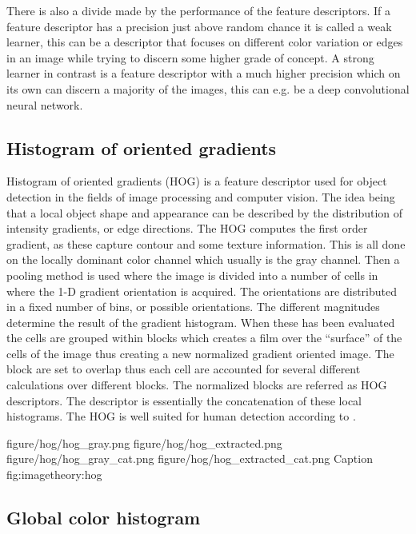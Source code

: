 There is also a divide made by the performance of the feature descriptors. If a feature descriptor has a precision just above random chance it is called a weak learner, this can be a descriptor that focuses on different color variation or edges in an image while trying to discern some higher grade of concept. A strong learner in contrast is a feature descriptor with a much higher precision which on its own can discern a majority of the images, this can e.g. be a deep convolutional neural network. 


\subsection{Histogram of oriented gradients}
\label{sec:hog_feature}
Histogram of oriented gradients (HOG) is a feature descriptor used for object detection in the fields of image processing and computer vision. The idea being that a local object shape and appearance can be described by the distribution of intensity gradients, or edge directions. The HOG computes the first order gradient, as these capture contour and some texture information. This is all done on the locally dominant color channel which usually is the gray channel. Then a pooling method is used where the image is divided into a number of cells in where the 1-D gradient orientation is acquired. The orientations are distributed in a fixed number of bins, or possible orientations. The different magnitudes determine the result of the gradient histogram. When these has been evaluated the cells are grouped within blocks which creates a film over the ``surface'' of the cells of the image thus creating a new normalized gradient oriented image. The block are set to overlap thus each cell are accounted for several different calculations over different blocks. The normalized blocks are referred as HOG descriptors. The descriptor is essentially the concatenation of these local histograms. The HOG is well suited for human detection according to \cite{dalal2005histograms}. 

\fourfigure
{figure/hog/hog_gray.png}
{figure/hog/hog_extracted.png}
{figure/hog/hog_gray_cat.png}
{figure/hog/hog_extracted_cat.png}
{Caption}
{fig:imagetheory:hog} 

\subsection{Global color histogram}
\label{sec:gch_feature}

